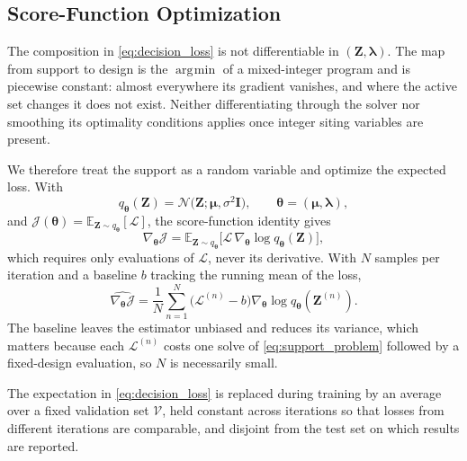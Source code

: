 \documentclass[journal]{IEEEtran}
\DeclareMathOperator*{\argmin}{\arg\!\min}
\begin{document}
\subsection{Score-Function Optimization}
\label{sec:score_function}

The composition in \eqref{eq:decision_loss} is not differentiable in
$(\boldsymbol{Z},\boldsymbol{\lambda})$. The map from support to design is
the $\argmin$ of a mixed-integer program and is piecewise constant:
almost everywhere its gradient vanishes, and where the active set changes
it does not exist. Neither differentiating through the solver nor
smoothing its optimality conditions applies once integer siting variables
are present.

We therefore treat the support as a random variable and optimize the
expected loss. With
\begin{equation}
q_{\boldsymbol{\theta}}(\boldsymbol{Z})
=\mathcal{N}\bigl(\boldsymbol{Z};\boldsymbol{\mu},
\sigma^2\boldsymbol{I}\bigr),
\qquad
\boldsymbol{\theta}=(\boldsymbol{\mu},\boldsymbol{\lambda}),
\label{eq:policy}
\end{equation}
and $\mathcal{J}(\boldsymbol{\theta})
=\mathbb{E}_{\boldsymbol{Z}\sim q_{\boldsymbol{\theta}}}[\mathcal{L}]$,
the score-function identity gives
\begin{equation}
\nabla_{\boldsymbol{\theta}}\mathcal{J}
=\mathbb{E}_{\boldsymbol{Z}\sim q_{\boldsymbol{\theta}}}
\bigl[
\mathcal{L}\,\nabla_{\boldsymbol{\theta}}
\log q_{\boldsymbol{\theta}}(\boldsymbol{Z})
\bigr],
\label{eq:score_function}
\end{equation}
which requires only evaluations of $\mathcal{L}$, never its derivative.
With $N$ samples per iteration and a baseline $b$ tracking the running
mean of the loss,
\begin{equation}
\widehat{\nabla_{\boldsymbol{\theta}}\mathcal{J}}
=\frac{1}{N}\sum_{n=1}^{N}
\bigl(\mathcal{L}^{(n)}-b\bigr)
\nabla_{\boldsymbol{\theta}}
\log q_{\boldsymbol{\theta}}(\boldsymbol{Z}^{(n)}).
\label{eq:reinforce}
\end{equation}
The baseline leaves the estimator unbiased and reduces its variance,
which matters because each $\mathcal{L}^{(n)}$ costs one solve of
\eqref{eq:support_problem} followed by a fixed-design evaluation, so $N$
is necessarily small.

The expectation in \eqref{eq:decision_loss} is replaced during training by
an average over a fixed validation set $\mathcal{V}$, held constant across
iterations so that losses from different iterations are comparable, and
disjoint from the test set on which results are reported.
\end{document}
